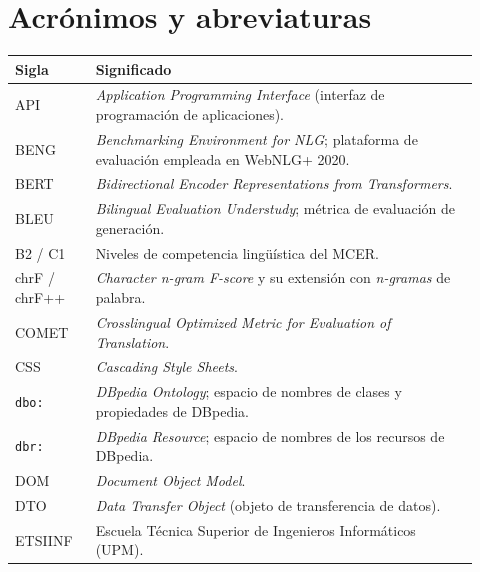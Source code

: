 \section{Acrónimos y abreviaturas}

\begin{longtable}{|p{0.16\linewidth}|p{0.76\linewidth}|}
	\hline
	\textbf{Sigla} & \textbf{Significado}                                                                          \\
	\hline
	\endhead
	API            & \textit{Application Programming Interface} (interfaz de programación de aplicaciones).        \\ \hline
	BENG           & \textit{Benchmarking Environment for NLG}; plataforma de evaluación empleada en WebNLG+ 2020. \\ \hline
	BERT           & \textit{Bidirectional Encoder Representations from Transformers}.                             \\ \hline
	BLEU           & \textit{Bilingual Evaluation Understudy}; métrica de evaluación de generación.                \\ \hline
	B2 / C1        & Niveles de competencia lingüística del MCER.                                                  \\ \hline
	chrF / chrF++  & \textit{Character n-gram F-score} y su extensión con \textit{n-gramas} de palabra.            \\ \hline
	COMET          & \textit{Crosslingual Optimized Metric for Evaluation of Translation}.                         \\ \hline
	CSS            & \textit{Cascading Style Sheets}.                                                              \\ \hline
	\texttt{dbo:}  & \textit{DBpedia Ontology}; espacio de nombres de clases y propiedades de DBpedia.             \\ \hline
	\texttt{dbr:}  & \textit{DBpedia Resource}; espacio de nombres de los recursos de DBpedia.                     \\ \hline
	DOM            & \textit{Document Object Model}.                                                               \\ \hline
	DTO            & \textit{Data Transfer Object} (objeto de transferencia de datos).                             \\ \hline
	ETSIINF        & Escuela Técnica Superior de Ingenieros Informáticos (UPM).                                    \\ \hline

\end{longtable}

